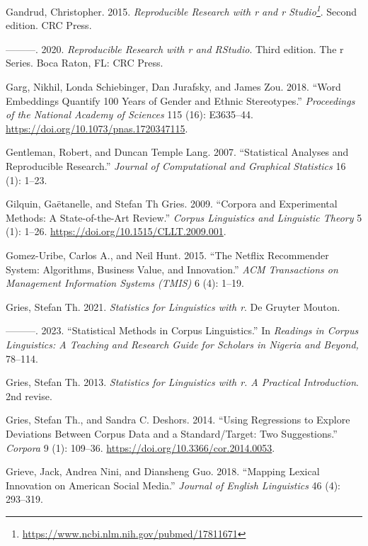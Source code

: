 \documentclass[
  letterpaper,
  DIV=11,
  numbers=noendperiod]{scrreprt}
\newlength{\cslhangindent}
\newenvironment{CSLReferences}[2] %
 {\begin{list}{}{%
  \setlength{\itemindent}{0pt}
  \setlength{\leftmargin}{0pt}
  \setlength{\parsep}{0pt}
  \ifodd #1
   \setlength{\leftmargin}{\cslhangindent}
   \setlength{\itemindent}{-1\cslhangindent}
  \fi
  \setlength{\itemsep}{#2\baselineskip}}}
 {\end{list}}
\theoremstyle{definition}
\theoremstyle{remark}
\DeclareRobustCommand{\href}[2]{#2\footnote{\url{#1}}}
\begin{document}
\begin{CSLReferences}{1}{0}
Gandrud, Christopher. 2015.
\emph{\href{https://www.ncbi.nlm.nih.gov/pubmed/17811671}{Reproducible
Research with r and r Studio}}. Second edition. CRC Press.

---------. 2020. \emph{Reproducible Research with r and RStudio}. Third
edition. The r Series. Boca Raton, FL: CRC Press.

Garg, Nikhil, Londa Schiebinger, Dan Jurafsky, and James Zou. 2018.
{``Word Embeddings Quantify 100 Years of Gender and Ethnic
Stereotypes.''} \emph{Proceedings of the National Academy of Sciences}
115 (16): E3635--44. \url{https://doi.org/10.1073/pnas.1720347115}.

Gentleman, Robert, and Duncan Temple Lang. 2007. {``Statistical Analyses
and Reproducible Research.''} \emph{Journal of Computational and
Graphical Statistics} 16 (1): 1--23.

Gilquin, Gaëtanelle, and Stefan Th Gries. 2009. {``Corpora and
Experimental Methods: A State-of-the-Art Review.''} \emph{Corpus
Linguistics and Linguistic Theory} 5 (1): 1--26.
\url{https://doi.org/10.1515/CLLT.2009.001}.

Gomez-Uribe, Carlos A., and Neil Hunt. 2015. {``The Netflix Recommender
System: Algorithms, Business Value, and Innovation.''} \emph{ACM
Transactions on Management Information Systems (TMIS)} 6 (4): 1--19.

Gries, Stefan Th. 2021. \emph{Statistics for Linguistics with r}. De
Gruyter Mouton.

---------. 2023. {``Statistical Methods in Corpus Linguistics.''} In
\emph{Readings in Corpus Linguistics: A Teaching and Research Guide for
Scholars in Nigeria and Beyond,} 78--114.

Gries, Stefan Th. 2013. \emph{Statistics for Linguistics with r. A
Practical Introduction}. 2nd revise.

Gries, Stefan Th., and Sandra C. Deshors. 2014. {``Using Regressions to
Explore Deviations Between Corpus Data and a Standard/Target: Two
Suggestions.''} \emph{Corpora} 9 (1): 109--36.
\url{https://doi.org/10.3366/cor.2014.0053}.

Grieve, Jack, Andrea Nini, and Diansheng Guo. 2018. {``Mapping Lexical
Innovation on American Social Media.''} \emph{Journal of English
Linguistics} 46 (4): 293--319.


\end{CSLReferences}
\end{document}
